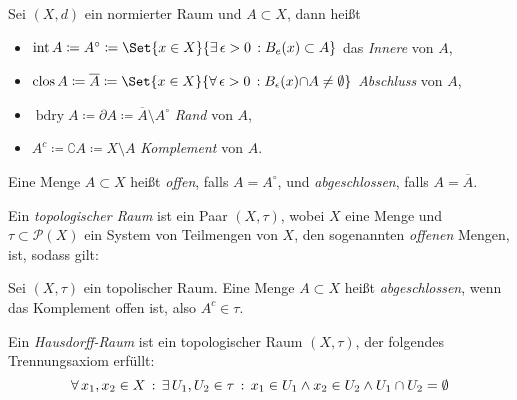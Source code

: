\documentclass{cheat-sheet}
\newcommand{\inte}{\mathop{\mathrm{int}}} %
\newcommand{\clos}{\mathop{\mathrm{clos}}} %
\newcommand{\bdry}{\mathop{\mathrm{bdry}}} %
\begin{document}
\begin{defn}
  Sei $(X, d)$ ein normierter Raum und $A \subset X$, dann heißt
  \begin{itemize}
    \item $\inte A \coloneqq A^\circ \coloneqq \Set{x \in X}{ \ex{\epsilon > 0} \! B_e(x) \subset A }$ das \emph{Innere} von $A$,
    \item $\clos A \coloneqq \overline{A} \coloneqq \Set{x \in X}{ \fa{\epsilon > 0} \! B_\epsilon(x) {\cap} A \not= \emptyset }$ \emph{Abschluss} von $A$,
    \item $\bdry A \coloneqq \partial A \coloneqq \overline{A} \setminus A^\circ$ \emph{Rand} von $A$,
    \item $A^c \coloneqq \complement A \coloneqq X \setminus A$ \emph{Komplement} von $A$.
  \end{itemize}
\end{defn}

\begin{defn}
  Eine Menge $A \subset X$ heißt \emph{offen}, falls $A = A^\circ$, und \emph{abgeschlossen}, falls $A = \overline{A}$.
\end{defn}


\begin{defn}
  Ein \emph{topologischer Raum} ist ein Paar $(X, \tau)$, wobei $X$ eine Menge und $\tau \subset \mathcal{P}(X)$ ein System von Teilmengen von $X$, den sogenannten \emph{offenen} Mengen, ist, sodass gilt:
  \vspace{-4pt}
  \begin{itemize}
  \end{itemize}
\end{defn}

\begin{defn}
  Sei $(X, \tau)$ ein topolischer Raum. Eine Menge $A \subset X$ heißt \emph{abgeschlossen}, wenn das Komplement offen ist, also $A^c \in \tau$.
\end{defn}

\begin{defn}
  Ein \emph{Hausdorff-Raum} ist ein topologischer Raum $(X, \tau)$, der folgendes Trennungsaxiom erfüllt:
  \[ \forall \, {x_1, x_2 \in X} \,:\, \exists \, {U_1, U_2 \in \tau} \,:\, x_1 \in U_1 \wedge x_2 \in U_2 \wedge U_1 \cap U_2 = \emptyset \]
\end{defn}
\end{document}
